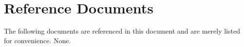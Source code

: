 \section{Reference Documents}
The following documents are referenced in this document and are merely listed for convenience.\newline\newline
\hspace{10mm}None.
